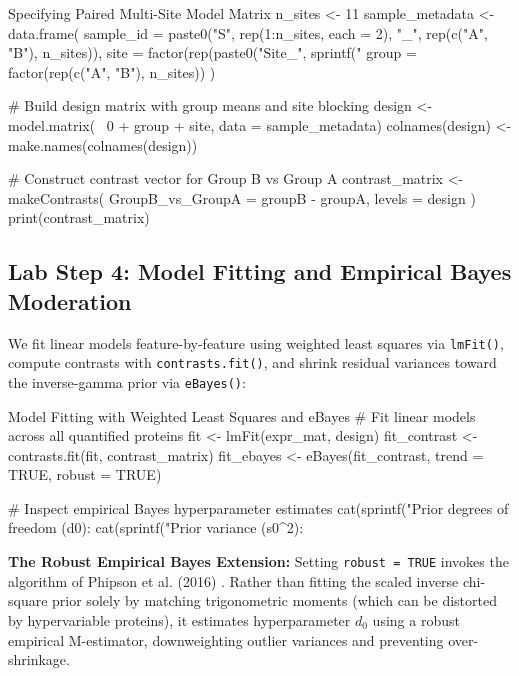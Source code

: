 \documentclass[11pt,twoside,openright]{book}
\begin{document}
\begin{rchunk}{Specifying Paired Multi-Site Model Matrix}
n_sites <- 11
sample_metadata <- data.frame(
  sample_id = paste0("S", rep(1:n_sites, each = 2), "_", rep(c("A", "B"), n_sites)),
  site      = factor(rep(paste0("Site_", sprintf("%
  group     = factor(rep(c("A", "B"), n_sites))
)

# Build design matrix with group means and site blocking
design <- model.matrix(~ 0 + group + site, data = sample_metadata)
colnames(design) <- make.names(colnames(design))

# Construct contrast vector for Group B vs Group A
contrast_matrix <- makeContrasts(
  GroupB_vs_GroupA = groupB - groupA,
  levels = design
)
print(contrast_matrix)
\end{rchunk}

\subsection{Lab Step 4: Model Fitting and Empirical Bayes Moderation}

We fit linear models feature-by-feature using weighted least squares via \texttt{lmFit()}, compute contrasts with \texttt{contrasts.fit()}, and shrink residual variances toward the inverse-gamma prior via \texttt{eBayes()}:

\begin{rchunk}{Model Fitting with Weighted Least Squares and eBayes}
# Fit linear models across all quantified proteins
fit <- lmFit(expr_mat, design)
fit_contrast <- contrasts.fit(fit, contrast_matrix)
fit_ebayes <- eBayes(fit_contrast, trend = TRUE, robust = TRUE)

# Inspect empirical Bayes hyperparameter estimates
cat(sprintf("Prior degrees of freedom (d0): %
cat(sprintf("Prior variance (s0^2): %
\end{rchunk}

\begin{deepdive}
\textbf{The Robust Empirical Bayes Extension:} Setting \texttt{robust = TRUE} invokes the algorithm of Phipson et al. (2016) \cite{phipson2016robust}. Rather than fitting the scaled inverse chi-square prior solely by matching trigonometric moments (which can be distorted by hypervariable proteins), it estimates hyperparameter $d_0$ using a robust empirical M-estimator, downweighting outlier variances and preventing over-shrinkage.
\end{deepdive}
\end{document}
